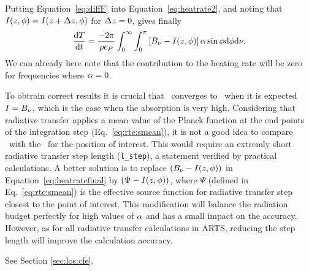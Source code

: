  Putting Equation~\ref{eq:diffF} into Equation~\ref{eq:heatrate2}, and
 noting that
 $I(z,\phi)=I(z+\Delta z,\phi)$
 for $\Delta z=0$,  gives finally
 \begin{equation}
   \label{eq:heatratefinal}
    \frac{\mathrm{d}T}{\mathrm{d}t} = 
        \frac{-2\pi}{\rho c_{P}} \int_0^\infty 
     \int_0^\pi \left[ B_{\nu} -I(z,\phi)
           \right] \alpha \sin\phi \mathrm{d}\phi   \mathrm{d}\nu.
 \end{equation}
 We can already here note that the contribution to the heating rate
 will be zero for frequencies where $\alpha=0$.
 
 To obtrain correct results it is crucial that \mpbi\ converges to
 \planckfunc\ when it is expected $I=B_{\nu}$, which is the
 case when the absorption is very high. Considering that radiative
 transfer applies a mean value of the Planck function at the end
 points of the integration step (Eq.~\ref{eq:rte:smean}), it is not a
 good idea to compare \mpbi\ with the \planckfunc\ for the position of
 interest. This would require an extremly short radiative transfer
 step length (\verb|l_step|), a statement verified by practical
 calculations. A better solution is to replace $(B_{\nu}
 -I(z,\phi))$ in Equation~\ref{eq:heatratefinal} by
 $(\Psi-I(z,\phi))$, where $\Psi$ (defined in
 Eq.~\ref{eq:rte:smean}) is the effective source function for
 radiative transfer step closest to the point of interest. This
 modification will balance the radiation budget perfectly for high
 values of $\alpha$ and has a small impact on the accuracy.
 However, as for all radiative transfer calculations in ARTS, reducing
 the step length will improve the calculation accuracy.
 
 

  \label{sec:rte:cfe}
 
  See Section \ref{sec:los:cfe}.



